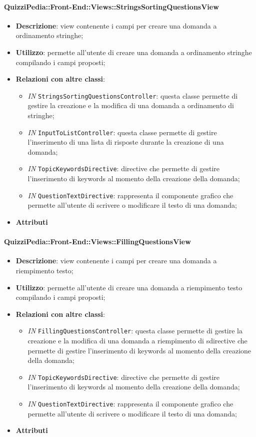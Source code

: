 \paragraph{QuizziPedia::Front-End::Views::StringsSortingQuestionsView}
\begin{itemize}
	\item \textbf{Descrizione}: view contenente i campi per creare una domanda a ordinamento stringhe;
	\item \textbf{Utilizzo}: permette all'utente di creare una domanda a ordinamento stringhe compilando i campi proposti;
	\item \textbf{Relazioni con altre classi}:
		\begin{itemize}
			\item \textit{IN} \texttt{StringsSortingQuestionsController}: questa classe permette di gestire la creazione e la modifica di una domanda a ordinamento di stringhe;
			\item \textit{IN} \texttt{InputToListController}: questa classe permette di gestire l'inserimento di una lista di risposte durante la creazione di una domanda;
			\item \textit{IN} \texttt{TopicKeywordsDirective}: directive che permette di gestire l'inserimento di keywords al momento della creazione della domanda;
			\item \textit{IN} \texttt{QuestionTextDirective}: rappresenta il componente grafico che permette all'utente di scrivere o modificare il testo di una domanda;
		\end{itemize}
	\item \textbf{Attributi}
\end{itemize}

\paragraph{QuizziPedia::Front-End::Views::FillingQuestionsView}
\begin{itemize}
	\item \textbf{Descrizione}: view contenente i campi per creare una domanda a riempimento testo;
	\item \textbf{Utilizzo}:  permette all'utente di creare una domanda a riempimento testo compilando i campi proposti;
	\item \textbf{Relazioni con altre classi}:
	\begin{itemize}
		\item \textit{IN} \texttt{FillingQuestionsController}: questa classe permette di gestire la creazione e la modifica di una domanda a riempimento di sdirective che permette di gestire l'inserimento di keywords al momento della creazione della domanda;
		\item \textit{IN} \texttt{TopicKeywordsDirective}: directive che permette di gestire l'inserimento di keywords al momento della creazione della domanda;
		\item \textit{IN} \texttt{QuestionTextDirective}: rappresenta il componente grafico che permette all'utente di scrivere o modificare il testo di una domanda;
	\end{itemize}
	\item \textbf{Attributi}
\end{itemize}


